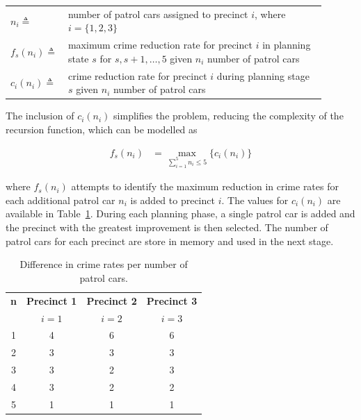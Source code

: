 \documentclass[a4paper,11pt]{article}
\begin{document}
\vspace{12pt}

\begin{tabular}{p{0.1\linewidth}  p{0.8\linewidth}}
$n_{i} \triangleq$ & number of patrol cars assigned to precinct $i$, where $i = \{1,2,3\}$  \\ 
  $f_s(n_{i}) \triangleq$&  maximum crime reduction rate for precinct $i$ in planning state $s$ for $s,s+1,\dots, 5$ given $n_i$ number of patrol cars\\
    $c_i(n_i) \triangleq$ & crime reduction rate for precinct $i$ during planning stage $s$ given $n_i$ number of patrol cars
\end{tabular}

\vspace{12pt}

The inclusion of $c_i(n_i)$ simplifies the problem, reducing the complexity of the recursion function, which can be modelled as 

\begin{align}
	f_s(n_i) &= \max_{\sum_{i=1}^5 n_i\leq 5} \{c_i(n_i)\}
\end{align}

where $f_s(n_i)$ attempts to identify the maximum reduction in crime rates for each  additional patrol car $n_i$ is added to precinct $i$. The values for $c_i(n_i)$ are available in Table~\ref{Q2:Tbl1}. During each planning phase, a single patrol car is added and the precinct with the greatest improvement is then selected. The number of patrol cars for each precinct are store in memory and used in the next stage.

\begin{table}[h]
\centering
\caption{Difference in crime rates per number of patrol cars.}
\begin{tabular}{c|ccc}
\hline
\textbf{n} & \textbf{Precinct 1} & \textbf{Precinct 2} & \textbf{Precinct 3} \\ 
&$i=1$ &$i=2$ &$i=3$  \\
\hline
1&	4&	6&	6 \\
2&	3&	3&	3\\
3&	3&	2&	3\\
4&	3&	2&	2\\
5&	1&	1&	1\\
\hline
\end{tabular}
\label{Q2:Tbl1}
\end{table}
\end{document}
